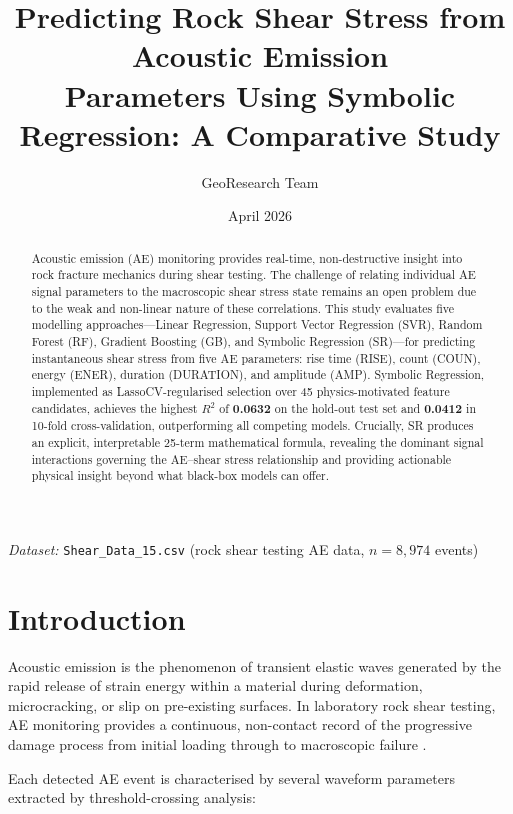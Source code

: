 \documentclass[12pt,a4paper]{article}
\title{\textbf{Predicting Rock Shear Stress from Acoustic Emission\\
Parameters Using Symbolic Regression: A Comparative Study}}
\author{GeoResearch Team}
\date{April 2026}
\begin{document}
\maketitle

\noindent\textit{Dataset:} \texttt{Shear\_Data\_15.csv} (rock shear testing AE data,
$n = 8{,}974$ events)

\begin{abstract}
Acoustic emission (AE) monitoring provides real-time, non-destructive insight
into rock fracture mechanics during shear testing. The challenge of relating
individual AE signal parameters to the macroscopic shear stress state remains an
open problem due to the weak and non-linear nature of these correlations. This
study evaluates five modelling approaches---Linear Regression, Support Vector
Regression (SVR), Random Forest (RF), Gradient Boosting (GB), and Symbolic
Regression (SR)---for predicting instantaneous shear stress from five AE
parameters: rise time (RISE), count (COUN), energy (ENER), duration (DURATION),
and amplitude (AMP). Symbolic Regression, implemented as LassoCV-regularised
selection over 45 physics-motivated feature candidates, achieves the highest
$R^{2}$ of \textbf{0.0632} on the hold-out test set and \textbf{0.0412} in
10-fold cross-validation, outperforming all competing models. Crucially, SR
produces an explicit, interpretable 25-term mathematical formula, revealing the
dominant signal interactions governing the AE--shear stress relationship and
providing actionable physical insight beyond what black-box models can offer.
\end{abstract}

\section{Introduction}
\label{sec:introduction}

Acoustic emission is the phenomenon of transient elastic waves generated by the
rapid release of strain energy within a material during deformation,
microcracking, or slip on pre-existing surfaces. In laboratory rock shear
testing, AE monitoring provides a continuous, non-contact record of the
progressive damage process from initial loading through to macroscopic failure
\citep{hardy2003, lockner1993}.

Each detected AE event is characterised by several waveform parameters extracted
by threshold-crossing analysis:
\end{document}
